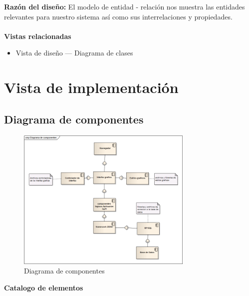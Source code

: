 \documentclass[12pt,oneside,letterpaper]{report}
\begin{document}
\textbf{Razón del diseño:}
El modelo de entidad - relación nos muestra las entidades relevantes para nuestro sistema así como sus  interrelaciones y propiedades.\\
\\

\textbf{Vistas relacionadas}
\begin{itemize}
\item Vista de diseño --- Diagrama de clases
\end{itemize}

\section{Vista de implementación}

\subsection{Diagrama de componentes}

\begin{figure}[h!]
  \centering
    \includegraphics[width=0.75\textwidth]{./img/img9.png}
  \caption{Diagrama de componentes}
\end{figure}


\textbf{Catalogo de elementos}\\
\end{document}
